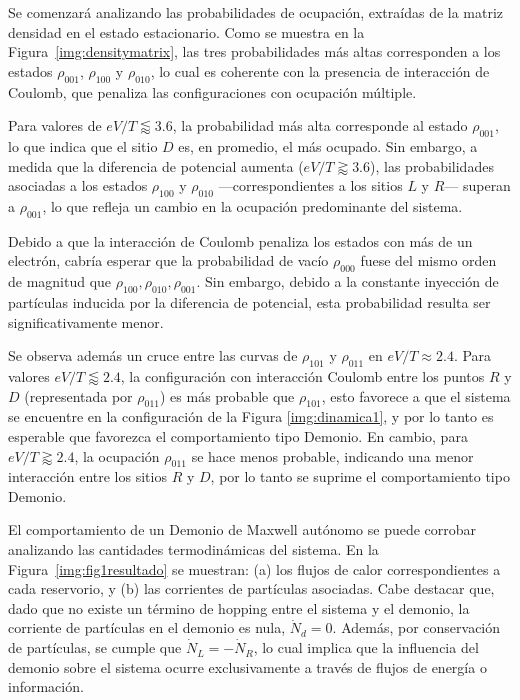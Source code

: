 Se comenzará analizando las probabilidades de ocupación, extraídas de la matriz densidad en el estado estacionario. Como se muestra en la Figura~\ref{img:densitymatrix}, las tres probabilidades más altas corresponden a los estados $\rho_{001}$, $\rho_{100}$ y $\rho_{010}$, lo cual es coherente con la presencia de interacción de Coulomb, que penaliza las configuraciones con ocupación múltiple.

Para valores de $eV/T \lessapprox 3.6$, la probabilidad más alta corresponde al estado $\rho_{001}$, lo que indica que el sitio $D$ es, en promedio, el más ocupado. Sin embargo, a medida que la diferencia de potencial aumenta ($eV/T \gtrapprox 3.6$), las probabilidades asociadas a los estados $\rho_{100}$ y $\rho_{010}$ —correspondientes a los sitios $L$ y $R$— superan a $\rho_{001}$, lo que refleja un cambio en la ocupación predominante del sistema.

Debido a que la interacción de Coulomb penaliza los estados con más de un electrón, cabría esperar que la probabilidad de vacío $\rho_{000}$ fuese del mismo orden de magnitud que $\rho_{100},\rho_{010},\rho_{001}$. Sin embargo, debido a la constante inyección de partículas inducida por la diferencia de potencial, esta probabilidad resulta ser significativamente menor. 

Se observa además un cruce entre las curvas de $\rho_{101}$ y $\rho_{011}$ en $eV/T \approx 2.4$. Para valores $eV/T \lessapprox 2.4$, la configuración con interacción Coulomb entre los puntos $R$ y $D$ (representada por $\rho_{011}$) es más probable que $\rho_{101}$, esto favorece a que el sistema se encuentre en la configuración de la Figura \ref{img:dinamica1}, y por lo tanto es esperable que favorezca el comportamiento tipo Demonio. En cambio, para $eV/T \gtrapprox 2.4$, la ocupación $\rho_{011}$ se hace menos probable, indicando una menor interacción entre los sitios $R$ y $D$, por lo tanto se suprime el comportamiento tipo Demonio.



El comportamiento de un Demonio de Maxwell autónomo se puede corrobar analizando las cantidades termodinámicas del sistema. En la Figura~\ref{img:fig1resultado} se muestran: (a) los flujos de calor correspondientes a cada reservorio, y (b) las corrientes de partículas asociadas. Cabe destacar que, dado que no existe un término de hopping entre el sistema y el demonio, la corriente de partículas en el demonio es nula, $\dot{N}_{d} = 0$. Además, por conservación de partículas, se cumple que $\dot{N}_{L} = -\dot{N}_{R}$, lo cual implica que la influencia del demonio sobre el sistema ocurre exclusivamente a través de flujos de energía o información.


